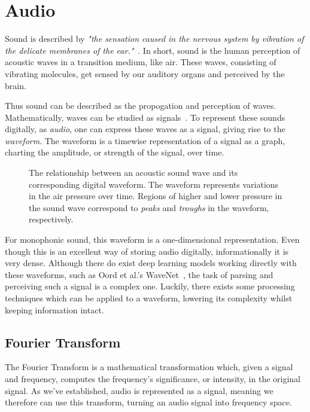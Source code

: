 \section{Audio}

Sound is described by \textit{"the sensation caused in the nervous system by vibration of the delicate membranes of the ear."}~\cite{1953fundamentals}. In short, sound is the human perception of acoustic waves in a transition medium, like air. These waves, consisting of vibrating molecules, get sensed by our auditory organs and perceived by the brain. 

Thus sound can be described as the propogation and perception of waves. Mathematically, waves can be studied as signals~\cite{8454362}. To represent these sounds digitally, as \textit{audio}, one can express these waves as a signal, giving rise to the \textit{waveform}. The waveform is a timewise representation of a signal as a graph, charting the amplitude, or strength of the signal, over time.

\begin{figure}[H]
    \centering
    
    \caption{The relationship between an acoustic sound wave and its corresponding digital waveform. The waveform represents variations in the air pressure over time. Regions of higher and lower pressure in the sound wave correspond to \textit{peaks} and \textit{troughs} in the waveform, respectively.}
    \label{WaveformFigure}
\end{figure}

For monophonic sound, this waveform is a one-dimensional representation. Even though this is an excellent way of storing audio digitally, informationally it is very dense. Although there do exist deep learning models working directly with these waveforms, such as Oord et al.'s WaveNet~\cite{oord2016wavenetgenerativemodelraw}, the task of parsing and perceiving such a signal is a complex one. Luckily, there exists some processing techniques which can be applied to a waveform, lowering its complexity whilst keeping information intact.

\subsection{Fourier Transform}

The Fourier Transform is a mathematical transformation which, given a signal and frequency, computes the frequency's significance, or intensity, in the original signal. As we've established, audio is represented as a signal, meaning we therefore can use this transform, turning an audio signal into frequency space. 

